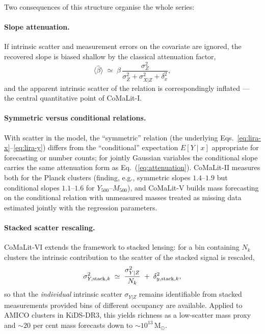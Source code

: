 \documentclass[11pt,a4paper]{article}
\newcommand{\Msun}{\mathrm{M}_\odot}
\begin{document}
Two consequences of this structure organise the whole series:

\paragraph{Slope attenuation.} If intrinsic scatter and measurement errors
on the covariate are ignored, the recovered slope is biased shallow by the
classical attenuation factor,
\begin{equation}
\big\langle \hat\beta \big\rangle \;\simeq\;
\beta \,
\frac{\sigma_Z^2}{\sigma_Z^2 + \sigma_{X|Z}^2 + \delta_x^2},
\label{eq:attenuation}
\end{equation}
and the apparent intrinsic scatter of the relation is correspondingly
inflated --- the central quantitative point of CoMaLit-I.

\paragraph{Symmetric versus conditional relations.} With scatter in the
model, the ``symmetric'' relation (the underlying
Eqs.~\ref{eq:lira-x}--\ref{eq:lira-y}) differs from the ``conditional''
expectation $E[Y \mid x]$ appropriate for forecasting or number counts; for
jointly Gaussian variables the conditional slope carries the same
attenuation form as Eq.~(\ref{eq:attenuation}). CoMaLit-II measures both
for the Planck clusters (finding, e.g., symmetric slopes $1.4$--$1.9$ but
conditional slopes $1.1$--$1.6$ for $Y_{500}$--$M_{500}$), and CoMaLit-V
builds mass forecasting on the conditional relation with unmeasured masses
treated as missing data estimated jointly with the regression parameters.

\paragraph{Stacked scatter rescaling.} CoMaLit-VI extends the framework to
stacked lensing: for a bin containing $N_k$ clusters the intrinsic
contribution to the scatter of the stacked signal is rescaled,
\begin{equation}
\sigma_{Y,{\rm stack},k}^2 \;\simeq\; \frac{\sigma_{Y|Z}^2}{N_k}
\;+\; \delta_{y,{\rm stack},k}^2,
\label{eq:comalit6}
\end{equation}
so that the \emph{individual} intrinsic scatter $\sigma_{Y|Z}$ remains
identifiable from stacked measurements provided bins of different occupancy
are available. Applied to AMICO clusters in KiDS-DR3, this yields richness
as a low-scatter mass proxy and $\sim 20$ per cent mass forecasts down to
$\sim 10^{13}\,\Msun$.
\end{document}
